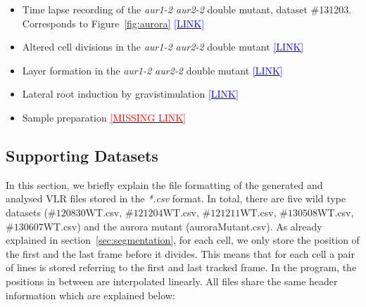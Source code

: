 \documentclass[11pt,a4paper, final]{article}
\begin{document}
\begin{itemize}
    \item Time lapse recording of the \emph{aur1-2 aur2-2} double mutant, dataset \#131203. Corresponds to Figure~\ref{fig:aurora} \href{http://youtu.be/y8b-0J4lPHg}{\textcolor{blue}{[LINK]}}
    \item Altered cell divisions in the \emph{aur1-2 aur2-2} double mutant \href{http://youtu.be/kkQZub-puVI}{\textcolor{blue}{[LINK]}}
    \item Layer formation in the \emph{aur1-2 aur2-2} double mutant  \href{http://youtu.be/FH5BJ177TGk}{\textcolor{blue}{[LINK]}}
    \item Lateral root induction by gravistimulation \href{http://youtu.be/sLvVCbWye-E}{\textcolor{blue}{[LINK]}}
    \item Sample preparation \href{http://youtu.be/sLvVCbWye-E}{\textcolor{red}{[MISSING LINK]}}


\end{itemize}

\clearpage
\subsection{Supporting Datasets}
\noindent
In this section, we briefly explain the file formatting of the generated and analysed VLR files stored in the \textit{*.csv} format. In total, there are five wild type datasets ($\#120830$WT.csv, $\#121204$WT.csv, $\#121211$WT.csv,  $\#130508$WT.csv, $\#130607$WT.csv) and the aurora mutant (auroraMutant.csv). As already explained in section~\ref{sec:segmentation}, for each cell, we only store the position of the first and the last frame before it divides. This means that for each cell a pair of lines is stored referring to the first and last tracked frame. In the program, the positions in between are interpolated linearly. All files share the same header information which are explained below:
\end{document}
